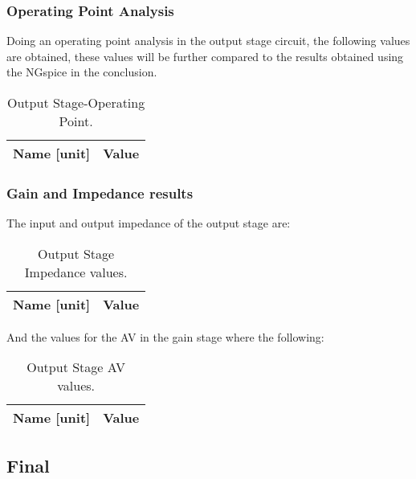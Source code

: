\subsubsection{Operating Point Analysis}

Doing an operating point analysis in the output stage circuit, the following values are obtained, these values will be further compared to the results obtained using the NGspice in the conclusion.\par


\begin{table}[H]
	\centering
	\begin{tabular}{|l|r|}
		\hline    
		{\bf Name [unit]} & {\bf Value} \\ \hline
		
	\end{tabular}
	\caption{Output Stage-Operating Point.}
	\label{tab:teo}
\end{table}

\subsubsection{Gain and Impedance results}

The input and output impedance of the output stage are:\par

\begin{table}[H]
	\centering
	\begin{tabular}{|l|r|}
		\hline    
		{\bf Name [unit]} & {\bf Value} \\ \hline
		
	\end{tabular}
	\caption{Output Stage Impedance values.}
	\label{tab:teo}
\end{table}

And the values for the AV in the gain stage where the following:

\begin{table}[H]
	\centering
	\begin{tabular}{|l|r|}
		\hline    
		{\bf Name [unit]} & {\bf Value} \\ \hline
		
	\end{tabular}
	\caption{Output Stage AV values.}
	\label{tab:teo}
\end{table}

\subsection{Final}

